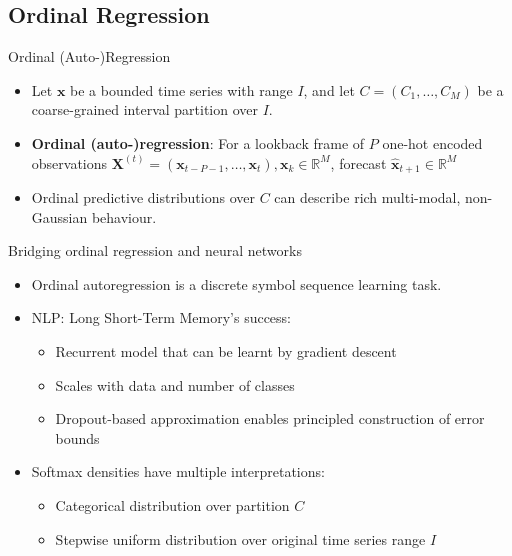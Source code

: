 \documentclass{beamer}
\theoremstyle{definition}
\theoremstyle{remark}
\begin{document}
\subsection{Ordinal Regression}
\begin{frame}{Ordinal (Auto-)Regression}
    \begin{itemize}
        \item \alert<+> {Let $\mathbf{x}$ be a bounded time series with range $I$, and let $C=(C_1, \dots, C_M)$ be a coarse-grained interval partition over $I$.} 
        \item \alert<+> {\textbf{Ordinal (auto-)regression}: For a lookback frame of $P$ one-hot encoded observations $\mathbf{X}^{(t)} = (\mathbf{x}_{t-P-1}, \dots, \mathbf{x}_t), \mathbf{x}_k\in \mathbb{R}^M$, forecast $\hat{\mathbf{x}}_{t+1}\in \mathbb{R}^M$}
        \item \alert<+>{Ordinal predictive distributions over $C$ can describe rich multi-modal, non-Gaussian behaviour.}
    \end{itemize}
\end{frame} 

\begin{frame}{Bridging ordinal regression and neural networks}
    \begin{itemize}
    \item \alert<+> {Ordinal autoregression is a discrete symbol sequence learning task. }\pause
    \item \alert<+> {NLP: Long Short-Term Memory's success: }\pause
    \begin{itemize}
        \item \alert<+> {Recurrent model that can be learnt by gradient descent }
        \item \alert<+> {Scales with data and number of classes }
        \item \alert<+> {Dropout-based approximation enables principled construction of error bounds \cite{gal2016theoretically} }\pause
    \end{itemize}
    \item \alert<+>{Softmax densities have multiple interpretations:} \pause
        \begin{itemize}
            \item \alert<+>{Categorical distribution over partition $C$}
            \item \alert<+>{Stepwise uniform distribution over original time series range $I$} \pause
        \end{itemize}
    \end{itemize}
\end{frame}
\end{document}

